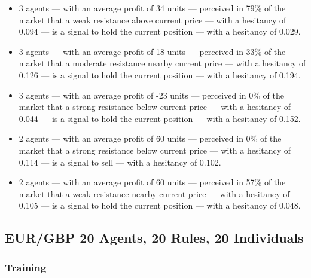 {\scriptsize
  \begin{itemize}
    \item 3 agents — with an average profit of 34 units — perceived in 79\% of
      the market that a weak resistance above current price — with a hesitancy
      of 0.094 — is a signal to hold the current position — with a hesitancy of
      0.029.
\item 3 agents — with an average profit of 18 units — perceived in 33\% of the
  market that a moderate resistance nearby current price — with a hesitancy of
  0.126 — is a signal to hold the current position — with a hesitancy of 0.194.
\item 3 agents — with an average profit of -23 units — perceived in 0\% of the
  market that a strong resistance below current price — with a hesitancy of
  0.044 — is a signal to hold the current position — with a hesitancy of 0.152.
\item 2 agents — with an average profit of 60 units — perceived in 0\% of the
  market that a strong resistance below current price — with a hesitancy of
  0.114 — is a signal to sell — with a hesitancy of 0.102.
\item 2 agents — with an average profit of 60 units — perceived in 57\% of the
  market that a weak resistance nearby current price — with a hesitancy of 0.105
  — is a signal to hold the current position — with a hesitancy of 0.048.
  \end{itemize}
}

\subsection{EUR/GBP 20 Agents, 20 Rules, 20 Individuals}
\label{}

\subsubsection{Training}
\label{}

